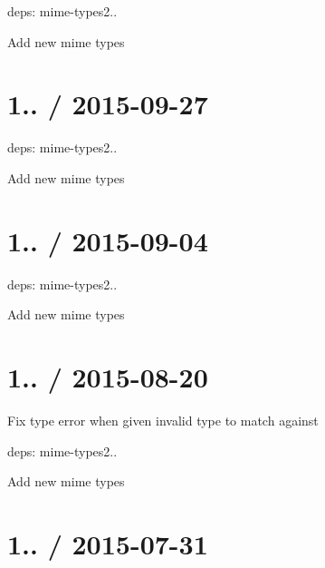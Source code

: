 \begin{DoxyItemize}
\item deps\+: mime-\/types2..
\begin{DoxyItemize}
\item Add new mime types
\end{DoxyItemize}
\end{DoxyItemize}

\section*{1.. / 2015-\/09-\/27 }


\begin{DoxyItemize}
\item deps\+: mime-\/types2..
\begin{DoxyItemize}
\item Add new mime types
\end{DoxyItemize}
\end{DoxyItemize}

\section*{1.. / 2015-\/09-\/04 }


\begin{DoxyItemize}
\item deps\+: mime-\/types2..
\begin{DoxyItemize}
\item Add new mime types
\end{DoxyItemize}
\end{DoxyItemize}

\section*{1.. / 2015-\/08-\/20 }


\begin{DoxyItemize}
\item Fix type error when given invalid type to match against
\item deps\+: mime-\/types2..
\begin{DoxyItemize}
\item Add new mime types
\end{DoxyItemize}
\end{DoxyItemize}

\section*{1.. / 2015-\/07-\/31 }


